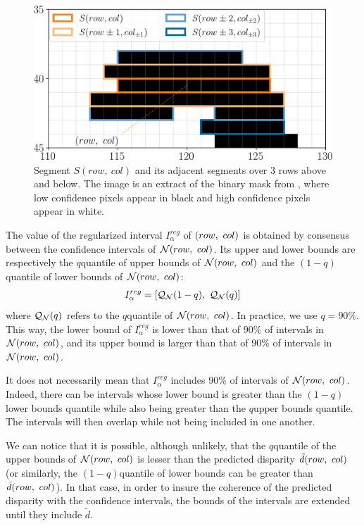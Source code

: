 \begin{figure}
    \centering
    \includegraphics[width=0.7\linewidth]{Images/Chap_5/low_confidence_segments.png}
    \caption{Segment $S(row, ~ col)$ and its adjacent segments over $3$ rows above and below. The image is an extract of the binary mask from , where low confidence pixels appear in black and high confidence pixels appear in white.}
    \label{fig:low_confidence_segments}
\end{figure}

The value of the regularized interval $I^{reg}_\alpha$ of $(row, ~col)$ is obtained by consensus between the confidence intervals of $\mathcal{N}(row, ~col)$. Its upper and lower bounds are respectively the $q$\ith quantile of upper bounds of $\mathcal{N}(row, ~col)$ and the $(1-q)$\ith quantile of lower bounds of $\mathcal{N}(row, ~col)$:
\begin{align}
    I^{reg}_\alpha=[\mathcal{Q}_{\mathcal{N}}(1-q), ~\mathcal{Q}_{\mathcal{N}}(q)]
\end{align}
where $\mathcal{Q}_{\mathcal{N}}(q)$ refers to the $q$\ith quantile of $\mathcal{N}(row, ~col)$. In practice, we use $q=90\%$. This way, the lower bound of $I^{reg}_\alpha$ is lower than that of $90\%$ of intervals in $\mathcal{N}(row, ~col)$, and its upper bound is larger than that of $90\%$ of intervals in $\mathcal{N}(row, ~col)$. 

\begin{remark}
    It does not necessarily mean that $I^{reg}_\alpha$ includes $90\%$ of intervals of $\mathcal{N}(row, ~col)$. Indeed, there can be intervals whose lower bound is greater than the $(1-q)$\ith lower bounds quantile while also being greater than the $q$\ith upper bounds quantile. The intervals will then overlap while not being included in one another.
\end{remark}

We can notice that it is possible, although unlikely, that the $q$\ith quantile of the upper bounds of $\mathcal{N}(row, ~col)$ is lesser than the predicted disparity $\tilde{d}(row, ~col)$ (or similarly, the $(1-q)$\ith quantile of lower bounds can be greater than $\tilde{d}(row, ~col)$). In that case, in order to insure the coherence of the predicted disparity with the confidence intervals, the bounds of the intervals are extended until they include $\tilde{d}$.


